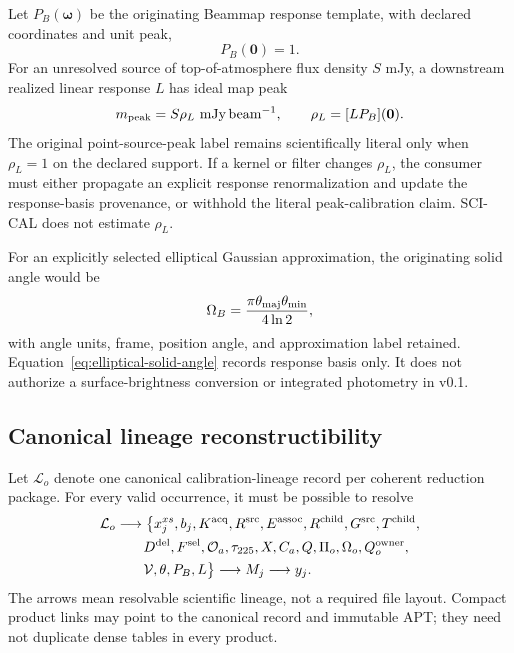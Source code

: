 Let \(P_B(\boldsymbol\omega)\) be the originating Beammap response template,
with declared coordinates and unit peak,
\begin{equation}
 P_B(\boldsymbol 0)=1.
 \label{eq:beam-peak}
\end{equation}
For an unresolved source of top-of-atmosphere flux density \(S\) mJy, a
downstream realized linear response \(L\) has ideal map peak
\begin{equation}
 m_{\rm peak}=S\rho_L\ \mjybeam,
 \qquad \rho_L=[L P_B](\boldsymbol 0).
 \label{eq:peak-response}
\end{equation}
The original point-source-peak label remains scientifically literal only when
\(\rho_L=1\) on the declared support. If a kernel or filter changes
\(\rho_L\), the consumer must either propagate an explicit response
renormalization and update the response-basis provenance, or withhold the
literal peak-calibration claim. SCI-CAL does not estimate \(\rho_L\).

For an explicitly selected elliptical Gaussian approximation, the originating
solid angle would be
\begin{equation}
 \Omega_B=\frac{\pi\theta_{\rm maj}\theta_{\rm min}}{4\ln 2},
 \label{eq:elliptical-solid-angle}
\end{equation}
with angle units, frame, position angle, and approximation label retained.
Equation~\eqref{eq:elliptical-solid-angle} records response basis only. It does
not authorize a surface-brightness conversion or integrated photometry in
v0.1.

\subsection{Canonical lineage reconstructibility}

Let \(\mathcal L_o\) denote one canonical calibration-lineage record per
coherent reduction package. For every valid occurrence, it must be possible to
resolve
\begin{equation}
 \begin{aligned}
 \mathcal L_o &\longrightarrow
 \bigl\{x^{xs}_j,b_j,K^{\rm acq},R^{\rm src},E^{\rm assoc},R^{\rm child},
 G^{\rm src},T^{\rm child},\\
 &\qquad D^{\rm del},F^{\rm sel},\mathcal O_a,\tau_{225},X,C_a,Q,\Pi_o,
 \Omega_o,Q^{\rm owner}_o,\\
 &\qquad \mathcal V,\theta,P_B,L\bigr\}
 \longrightarrow M_j\longrightarrow y_j.
 \end{aligned}
 \label{eq:reconstruction}
\end{equation}
The arrows mean resolvable scientific lineage, not a required file layout.
Compact product links may point to the canonical record and immutable APT;
they need not duplicate dense tables in every product.
